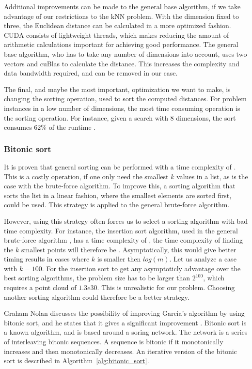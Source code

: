 Additional improvements can be made to the general base algorithm, if we take advantage of our restrictions to the kNN problem. With the dimension fixed to three, the Euclidean distance can be calculated in a more optimized fashion. CUDA consists of lightweight threads, which makes reducing the amount of arithmetic calculations important for achieving good performance. The general base algorithm, who has to take any number of dimensions into account, uses two vectors and cuBlas to calculate the distance. This increases the complexity and data bandwidth required, and can be removed in our case.

The final, and maybe the most important, optimization we want to make, is changing the sorting operation, used to sort the computed distances. For problem instances in a low number of dimensions, the most time consuming operation is the sorting operation. For instance, given a search with $8$ dimensions, the sort consumes $62\%$ of the runtime \cite{Garcia2008}.

\subsubsection{Bitonic sort} %
\label{ssub:bitonic_sort}

It is proven that general sorting can be performed with a time complexity of  \cite{Cormen:2001}. This is a costly operation, if one only need the smallest $k$ values in a list, as is the case with the brute-force algorithm. To improve this, a sorting algorithm that sorts the list in a linear fashion, where the smallest elements are sorted first, could be used. This strategy is applied to the general brute-force algorithm.

However, using this strategy often forces us to select a sorting algorithm with bad time complexity. For instance, the insertion sort algorithm, used in the general brute-force algorithm \cite{Cormen:2001}, has a time complexity of , the time complexity of finding the $k$ smallest points will therefore be . Asymptotically, this would give better timing results in cases where $k$ is smaller then $log(m)$. Let us analyze a case with $k=100$. For the insertion sort to get any asymptoticly advantage over the best sorting algorithms, the problem size has to be larger than $2^{100}$, which requires a point cloud of $1.3e30$. This is unrealistic for our problem. Choosing another sorting algorithm could therefore be a better strategy.

Graham Nolan discusses the possibility of improving Garcia's algorithm by using bitonic sort, and he states that it gives a significant improvement \citep{Nolan}. Bitonic sort is a known  algorithm, and is based around a soring network. The network is a series of interleaving bitonic sequences. A sequence is bitonic if it monotonically increases and then monotonically decreases\cite{Cormen:2001}. An iterative version of the bitonic sort is described in Algorithm~\ref{alg:bitonic_sort}.

